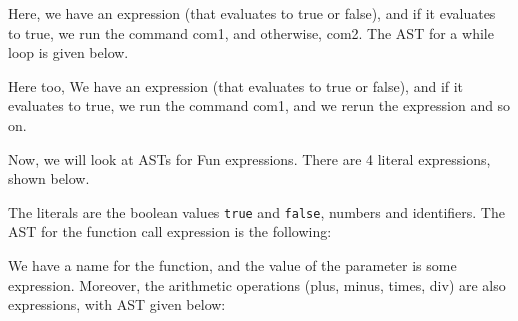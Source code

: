 \documentclass[a4paper, openany]{memoir}
\begin{document}
\noindent Here, we have an expression (that evaluates to true or false), and if it evaluates to true, we run the command com1, and otherwise, com2. The AST for a while loop is given below.
\begin{figure}[H]
    \centering
\end{figure}
\noindent Here too, We have an expression (that evaluates to true or false), and if it evaluates to true, we run the command com1, and we rerun the expression and so on.

Now, we will look at ASTs for Fun expressions. There are 4 literal expressions, shown below.
\begin{figure}[H]
    \centering
\end{figure}
\noindent The literals are the boolean values \texttt{true} and \texttt{false}, numbers and identifiers. The AST for the function call expression is the following:
\begin{figure}[H]
    \centering
\end{figure}
\noindent We have a name for the function, and the value of the parameter is some expression. Moreover, the arithmetic operations (plus, minus, times, div) are also expressions, with AST given below:
\end{document}
